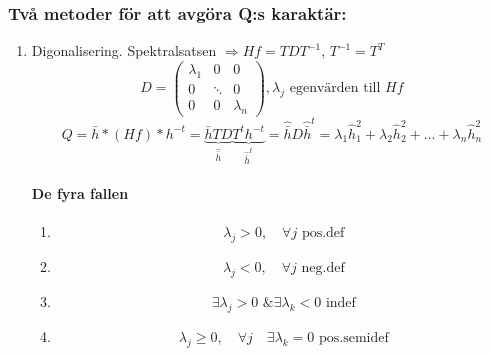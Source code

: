 \documentclass[a4paper]{article}
\begin{document}
\subsubsection{Två metoder för att avgöra Q:s karaktär:}
\begin{enumerate}
\item Digonalisering. Spektralsatsen $\Rightarrow Hf = TDT^{-1}$, $T^{-1} = T^T$
$$
	D = 
	\begin{pmatrix}
		\lambda_1 & 0 & 0 \\
		0 & \ddots & 0 \\
		0 & 0 & \lambda_n
	\end{pmatrix} 
	, \lambda_j \text{ egenvärden till } Hf
$$
$$
	Q = \bar{h}*(Hf)*h^{-t} = \underbrace{\bar{h}TD}_{\hat{\bar{h}}}\underbrace{T^th^{-t}}_{\hat{\bar{h}}^t} = \hat{\bar{h}}D\hat{\bar{h}}^t = \lambda_1\hat{h}^2_1 + \lambda_2\hat{h}^2_2 + \ldots + \lambda_n\hat{h}^2_n
$$

\paragraph{De fyra fallen}
\begin{enumerate}
\item 
$$ \lambda_j > 0, \quad \forall j \text{ pos.def} $$
\item 
$$ \lambda_j < 0, \quad \forall j \text{ neg.def} $$
\item 
$$ \exists\lambda_j > 0 \text{ \& } \exists\lambda_k < 0 \text{ indef} $$
\item 
$$ \lambda_j \geq 0, \quad \forall j \quad\exists\lambda_k = 0 \text{ pos.semidef} $$
\end{enumerate}


\end{enumerate}
\end{document}
